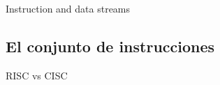 Instruction and data streams



\subsection{El conjunto de instrucciones}

RISC vs CISC

% 
% 
% 
% 
% 

